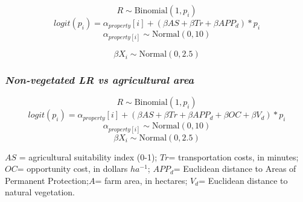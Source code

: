 \documentclass[
	12pt,				%
	oneside,			%
	a4paper,			%
	chapter=TITLE,		%
	section=TITLE,		%
	brazil,			%
	english				%
	]{abntex2}
\begin{document}
\[ R  \sim \text{Binomial}{(1,p_i)}  \]
\[ logit (p_i) = \alpha_{property}[i] + (\beta{AS} + \beta{Tr}+\beta{APP_d})*p_i \]
\[ \alpha_{property[i]}\sim \text{Normal}{(0,10)} \]

\[ \beta{X_i}\sim \text{Normal}{(0,2.5)}\]

\hypertarget{non-vegetated-lr-vs-agricultural-area}{%
\subsubsection{\texorpdfstring{\emph{Non-vegetated LR vs agricultural area}}{Non-vegetated LR vs agricultural area}}\label{non-vegetated-lr-vs-agricultural-area}}

\[ R  \sim \text{Binomial}{(1,p_i)}  \]
\[ logit (p_i) = \alpha_{property}[i] + (\beta{AS} +\beta{Tr}+\beta{APP_d}+\beta{OC}+\beta{V_d})*p_i \]
\[ \alpha_{property[i]}\sim \text{Normal}{(0,10)} \]
\[ \beta{X_i}\sim \text{Normal}{(0,2.5)}\]

\(AS\) = agricultural suitability index (0-1); \(Tr\)= transportation costs, in minutes; \(OC\)= opportunity cost, in dollars \(ha^{-1}\); \(APP_d\)= Euclidean distance to Areas of Permanent Protection;\(A\)= farm area, in hectares; \(V_d\)= Euclidean distance to natural vegetation.
\end{document}
